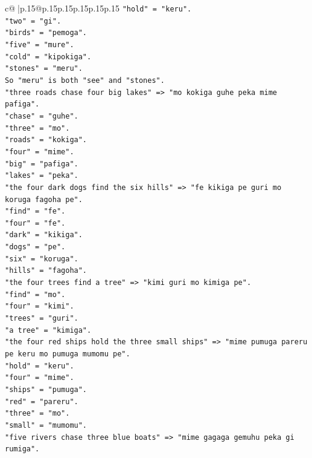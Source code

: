\documentclass{article}
\begin{document}
{\begin{supertabular}{c@{$\;$}|p{.15\linewidth}@{}p{.15\linewidth}p{.15\linewidth}p{.15\linewidth}p{.15\linewidth}p{.15\linewidth}}
{{{\texttt{"hold" = "keru".} \\
\texttt{"two" = "gi".} \\
\texttt{"birds" = "pemoga".} \\
\texttt{"five" = "mure".} \\
\texttt{"cold" = "kipokiga".} \\
\texttt{"stones" = "meru".} \\
\texttt{So "meru" is both "see" and "stones".} \\
\texttt{"three roads chase four big lakes" => "mo kokiga guhe peka mime pafiga".} \\
\texttt{"chase" = "guhe".} \\
\texttt{"three" = "mo".} \\
\texttt{"roads" = "kokiga".} \\
\texttt{"four" = "mime".} \\
\texttt{"big" = "pafiga".} \\
\texttt{"lakes" = "peka".} \\
\texttt{"the four dark dogs find the six hills" => "fe kikiga pe guri mo koruga fagoha pe".} \\
\texttt{"find" = "fe".} \\
\texttt{"four" = "fe".} \\
\texttt{"dark" = "kikiga".} \\
\texttt{"dogs" = "pe".} \\
\texttt{"six" = "koruga".} \\
\texttt{"hills" = "fagoha".} \\
\texttt{"the four trees find a tree" => "kimi guri mo kimiga pe".} \\
\texttt{"find" = "mo".} \\
\texttt{"four" = "kimi".} \\
\texttt{"trees" = "guri".} \\
\texttt{"a tree" = "kimiga".} \\
\texttt{"the four red ships hold the three small ships" => "mime pumuga pareru pe keru mo pumuga mumomu pe".} \\
\texttt{"hold" = "keru".} \\
\texttt{"four" = "mime".} \\
\texttt{"ships" = "pumuga".} \\
\texttt{"red" = "pareru".} \\
\texttt{"three" = "mo".} \\
\texttt{"small" = "mumomu".} \\
\texttt{"five rivers chase three blue boats" => "mime gagaga gemuhu peka gi rumiga".} \\
}}}
\end{supertabular}}
\end{document}
